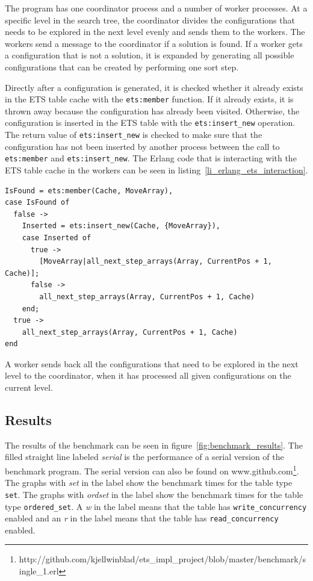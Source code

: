\documentclass[aps,pre,preprint,nofootinbib]{revtex4}
\begin{document}
    The program has one coordinator process and a number of worker processes.
    At a specific level in the search tree, the coordinator divides the configurations that needs to be explored in the next level evenly and sends them to the workers.
    The workers send a message to the coordinator if a solution is found.
    If a worker gets a configuration that is not a solution, it is expanded by generating all possible configurations that can be created by performing one sort step.
    
    Directly after a configuration is generated, it is checked whether it already exists in the ETS table cache with the \verb|ets:member| function.
    If it already exists, it is thrown away because the configuration has already been visited.
    Otherwise, the configuration is inserted in the ETS table with the \verb|ets:insert_new| operation.
    The return value of \verb|ets:insert_new| is checked to make sure that the configuration has not been inserted by another process between the call to \verb|ets:member| and \verb|ets:insert_new|.
    The Erlang code that is interacting with the ETS table cache in the workers can be seen in listing~\ref{li_erlang_ets_interaction}.

    \lstset{language=erlang, caption=Worker code that is interacting with ETS, label=li_erlang_ets_interaction} 
\begin{lstlisting}[float=htb] 
IsFound = ets:member(Cache, MoveArray),
case IsFound of
  false ->
    Inserted = ets:insert_new(Cache, {MoveArray}),
    case Inserted of
      true ->
        [MoveArray|all_next_step_arrays(Array, CurrentPos + 1, Cache)];
      false ->
        all_next_step_arrays(Array, CurrentPos + 1, Cache)
    end;
  true ->
    all_next_step_arrays(Array, CurrentPos + 1, Cache)
end
\end{lstlisting}
    
    A worker sends back all the configurations that need to be explored in the next level to the coordinator, when it has processed all given configurations on the current level.


\subsection{Results}

  The results of the benchmark can be seen in figure~\ref{fig:benchmark_results}.
  The filled straight line labeled \emph{serial} is the performance of a serial version of the benchmark program.
  The serial version can also be found on www.github.com\footnote{http://github.com/kjellwinblad/ets\_impl\_project/blob/master/benchmark/single\_1.erl}.
  The graphs with \emph{set} in the label show the benchmark times for the table type \verb|set|.
  The graphs with \emph{ordset} in the label show the benchmark times for the table type \verb|ordered_set|.
  A \emph{w} in the label means that the table has \verb|write_concurrency| enabled and an \emph{r} in the label means that the table has \verb|read_concurrency| enabled.
  
\end{document}
